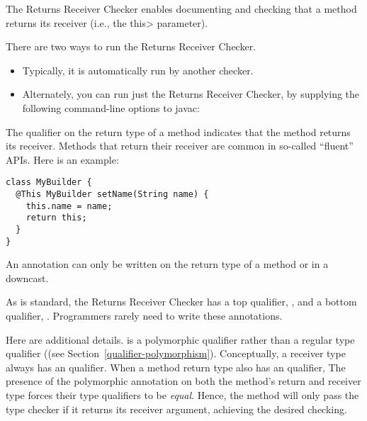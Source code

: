 \htmlhr
{}

The Returns Receiver Checker enables documenting and checking that a method
returns its receiver (i.e., the \<this> parameter).

There are two ways to run the Returns Receiver Checker.
\begin{itemize}
\item
Typically, it is automatically run by another checker.
\item
Alternately, you can run just the Returns Receiver Checker, by
supplying the following command-line options to javac:
\end{itemize}



The qualifier  on the return
type of a method indicates that the method returns its receiver.  Methods
that return their receiver are common in so-called ``fluent'' APIs.  Here
is an example:

\begin{Verbatim}
class MyBuilder {
  @This MyBuilder setName(String name) {
    this.name = name;
    return this;
  }
}
\end{Verbatim}

An  annotation can only be
written on the return type of a method or in a downcast.

As is standard, the Returns Receiver Checker has a top qualifier,
, and a bottom qualifier,
.
Programmers rarely need to write these annotations.

Here are additional details.  
is a polymorphic qualifier rather than a regular type qualifier ((see
Section~\ref{qualifier-polymorphism}). Conceptually, a receiver type always has
an  qualifier. When a method
return type also has an 
qualifier, The presence of the polymorphic annotation on both the method's
return and receiver type forces their type qualifiers to be \emph{equal}. Hence,
the method will only pass the type checker if it returns its receiver argument,
achieving the desired checking.


